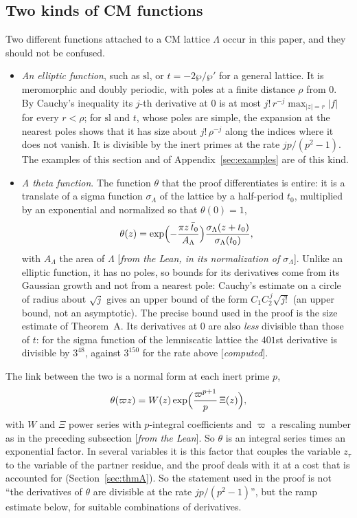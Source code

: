 \documentclass[11pt]{amsart}
\numberwithin{equation}{section}
\theoremstyle{definition}
\theoremstyle{remark}
\renewcommand{\sl}{\mathrm{sl}}
\newcommand{\status}[1]{\textup{[\emph{#1}]}}
\begin{document}
\subsection*{Two kinds of CM functions}
Two different functions attached to a CM lattice $\Lambda$ occur in this paper, and they should not be confused.
\begin{itemize}[leftmargin=2em]
\item \emph{An elliptic function}, such as $\sl$, or $t=-2\wp/\wp'$ for a general lattice. It is meromorphic and doubly periodic, with poles at a finite distance $\rho$ from $0$. By Cauchy's inequality its $j$-th derivative at $0$ is at most $j!\,r^{-j}\max_{|z|=r}|f|$ for every $r<\rho$; for $\sl$ and $t$, whose poles are simple, the expansion at the nearest poles shows that it has size about $j!\,\rho^{-j}$ along the indices where it does not vanish. It is divisible by the inert primes at the rate $jp/(p^2-1)$. The examples of this section and of Appendix~\ref{sec:examples} are of this kind.
\item \emph{A theta function}. The function $\theta$ that the proof differentiates is entire: it is a translate of a sigma function $\sigma_\Lambda$ of the lattice by a half-period $t_0$, multiplied by an exponential and normalized so that $\theta(0)=1$,
\begin{equation}\label{eq:thetadef}
 \theta(z)=\exp\Bigl(-\frac{\pi z\,\bar t_0}{A_\Lambda}\Bigr)\frac{\sigma_\Lambda(z+t_0)}{\sigma_\Lambda(t_0)},
\end{equation}
with $A_\Lambda$ the area of $\Lambda$ \status{from the Lean, in its normalization of $\sigma_\Lambda$}. Unlike an elliptic function, it has no poles, so bounds for its derivatives come from its Gaussian growth and not from a nearest pole: Cauchy's estimate on a circle of radius about $\sqrt j$ gives an upper bound of the form $C_1C_2^{\,j}\sqrt{j!}$ (an upper bound, not an asymptotic). The precise bound used in the proof is the size estimate of Theorem~A. Its derivatives at $0$ are also \emph{less} divisible than those of $t$: for the sigma function of the lemniscatic lattice the $401$st derivative is divisible by $3^{48}$, against $3^{150}$ for the rate above \status{computed}.
\end{itemize}
The link between the two is a normal form at each inert prime $p$,
\begin{equation}\label{eq:normalform}
 \theta(\varpi z)=W(z)\exp\Bigl(\frac{\varpi^{p+1}}p\,\Xi(z)\Bigr),
\end{equation}
with $W$ and $\Xi$ power series with $p$-integral coefficients and $\varpi$ a rescaling number as in the preceding subsection \status{from the Lean}. So $\theta$ is an integral series times an exponential factor. In several variables it is this factor that couples the variable $z_\tau$ to the variable of the partner residue, and the proof deals with it at a cost that is accounted for (Section~\ref{sec:thmA}). So the statement used in the proof is not ``the derivatives of $\theta$ are divisible at the rate $jp/(p^2-1)$'', but the ramp estimate below, for suitable combinations of derivatives.
\end{document}
